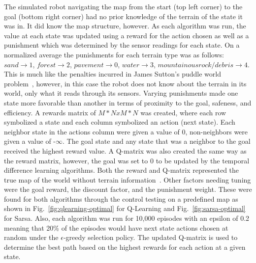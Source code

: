 \documentclass[12pt,american]{report}
\begin{document}
The simulated robot navigating the map from the start (top left corner) to the goal (bottom right corner) had no prior knowledge of the terrain of the state it was in.  It did know the map structure, however.  As each algorithm was run, the value at each state was updated using a reward for the action chosen as well as a punishment which was determined by the sensor readings for each state. On a normalized average the punishments for each terrain type was as follows: $sand \rightarrow 1$, $forest \rightarrow 2$, $pavement \rightarrow 0$, $water \rightarrow 3$, $mountainous rock/debris \rightarrow 4$. This is much like the penalties incurred in James Sutton's puddle world problem~\cite{sutton1996generalization}, however, in this case the robot does not know about the terrain in its world, only what it reads through its sensors. Varying punishments made one state more favorable than another in terms of proximity to the goal, safeness, and efficiency. A rewards matrix of $M*N x M*N$ was created, where each row symbolized a state and each column symbolized an action (next state).  Each neighbor state in the actions column were given a value of 0, non-neighbors were given a value of -\begin{math}\infty\end{math}. The goal state and any state that was a neighbor to the goal received the highest reward value.  A Q-matrix was also created the same way as the reward matrix, however, the goal was set to 0 to be updated by the temporal difference learning algorithms. Both the reward and Q-matrix represented the true map of the world without terrain information~\cite{tutorial}. Other factors needing tuning were the goal reward, the discount factor, and the punishment weight.  These were found for both algorithms through the control testing on a predefined map as shown in Fig.~\ref{fig:qlearning-optimal} for Q-Learning and Fig.~\ref{fig:sarsa-optimal} for Sarsa. Also, each algorithm was run for 10,000 episodes with an epsilon of 0.2 meaning that 20\% of the episodes would have next state actions chosen at random under the \begin{math}\epsilon\end{math}-greedy selection policy. The updated Q-matrix is used to determine the best path based on the highest rewards for each action at a given state.
\end{document}
